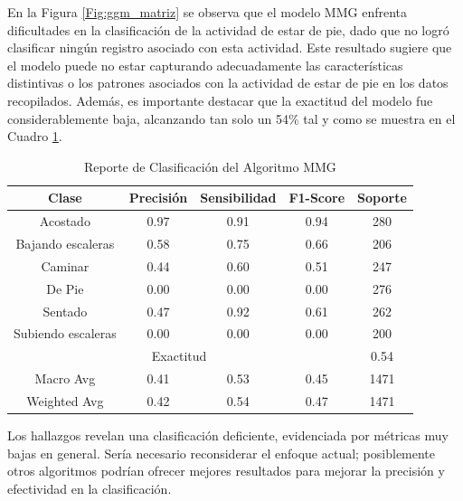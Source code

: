 \documentclass{esannV2}
\begin{document}
En la Figura \ref{Fig:ggm_matriz} se observa que el modelo MMG enfrenta dificultades en la clasificación de la actividad de estar de pie, dado que no logró clasificar ningún registro asociado con esta actividad. Este resultado sugiere que el modelo puede no estar capturando adecuadamente las características distintivas o los patrones asociados con la actividad de estar de pie en los datos recopilados. Además, es importante destacar que la exactitud del modelo fue considerablemente baja, alcanzando tan solo un 54\% tal y como se muestra en el Cuadro \ref{tab:classification_report_GGM}. 
\begin{table}[h]
    \centering
    \begin{tabular}{|c|c|c|c|c|}
        \hline
        \textbf{Clase} & \textbf{Precisión} & \textbf{Sensibilidad} & \textbf{F1-Score} & \textbf{Soporte} \\ \hline
        Acostado & 0.97 & 0.91 & 0.94 & 280 \\ \hline
        Bajando escaleras & 0.58 & 0.75 & 0.66 & 206 \\ \hline
        Caminar & 0.44 & 0.60 & 0.51 & 247 \\ \hline
        De Pie & 0.00 & 0.00 & 0.00 & 276 \\ \hline
        Sentado & 0.47 & 0.92 & 0.61 & 262 \\ \hline
        Subiendo escaleras & 0.00 & 0.00 & 0.00 & 200 \\ \hline
        \multicolumn{4}{|c|}{Exactitud} & 0.54 \\ \hline
        \multicolumn{1}{|c|}{Macro Avg} & 0.41 & 0.53 & 0.45 & 1471 \\ \hline
        \multicolumn{1}{|c|}{Weighted Avg} & 0.42 & 0.54 & 0.47 & 1471 \\ \hline
    \end{tabular}
    \caption{Reporte de Clasificación del Algoritmo MMG}
    \label{tab:classification_report_GGM}
\end{table}

Los hallazgos revelan una clasificación deficiente, evidenciada por métricas muy bajas en general. Sería necesario reconsiderar el enfoque actual; posiblemente otros algoritmos podrían ofrecer mejores resultados para mejorar la precisión y efectividad en la clasificación.
\end{document}
